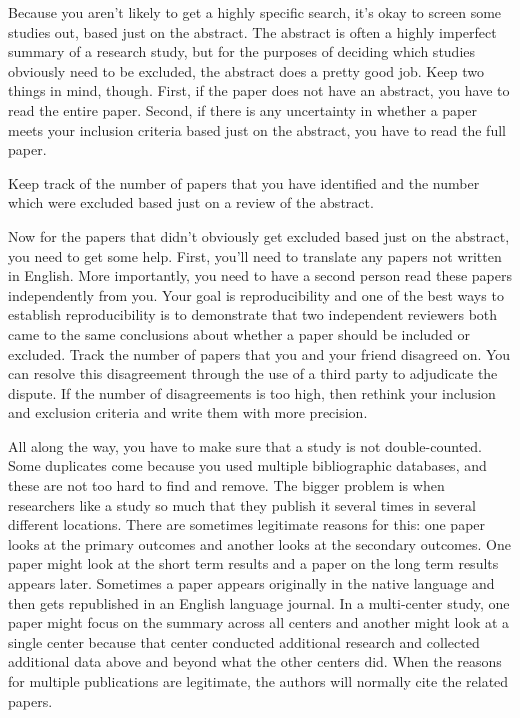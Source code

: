 \documentclass[
  letterpaper,
  DIV=11,
  numbers=noendperiod]{scrreprt}
\begin{document}
\begin{tcolorbox}
Because you aren't likely to get a highly specific search, it's okay to
screen some studies out, based just on the abstract. The abstract is
often a highly imperfect summary of a research study, but for the
purposes of deciding which studies obviously need to be excluded, the
abstract does a pretty good job. Keep two things in mind, though. First,
if the paper does not have an abstract, you have to read the entire
paper. Second, if there is any uncertainty in whether a paper meets your
inclusion criteria based just on the abstract, you have to read the full
paper.

Keep track of the number of papers that you have identified and the
number which were excluded based just on a review of the abstract.

Now for the papers that didn't obviously get excluded based just on the
abstract, you need to get some help. First, you'll need to translate any
papers not written in English. More importantly, you need to have a
second person read these papers independently from you. Your goal is
reproducibility and one of the best ways to establish reproducibility is
to demonstrate that two independent reviewers both came to the same
conclusions about whether a paper should be included or excluded. Track
the number of papers that you and your friend disagreed on. You can
resolve this disagreement through the use of a third party to adjudicate
the dispute. If the number of disagreements is too high, then rethink
your inclusion and exclusion criteria and write them with more
precision.

All along the way, you have to make sure that a study is not
double-counted. Some duplicates come because you used multiple
bibliographic databases, and these are not too hard to find and remove.
The bigger problem is when researchers like a study so much that they
publish it several times in several different locations. There are
sometimes legitimate reasons for this: one paper looks at the primary
outcomes and another looks at the secondary outcomes. One paper might
look at the short term results and a paper on the long term results
appears later. Sometimes a paper appears originally in the native
language and then gets republished in an English language journal. In a
multi-center study, one paper might focus on the summary across all
centers and another might look at a single center because that center
conducted additional research and collected additional data above and
beyond what the other centers did. When the reasons for multiple
publications are legitimate, the authors will normally cite the related
papers.


\end{tcolorbox}
\end{document}
